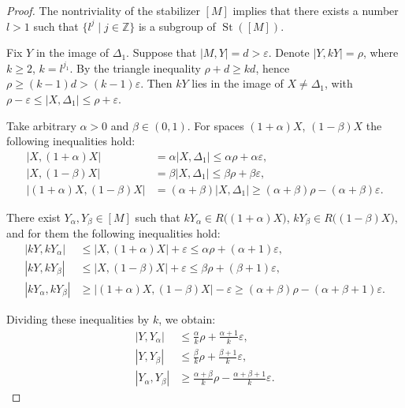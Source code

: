 \documentclass[leqno]{article}
\begin{document}
\begin{proof}
  The nontriviality of the stabilizer $[M]$ implies that there exists
  a number $l > 1$ such that $\{l^{j} \mid j\in \mathbb{Z}\}$ is a
  subgroup of $\operatorname{St}([M])$.

  Fix $Y$ in the image of $\Delta_{1}$. Suppose that $|M, Y| = d >
  \varepsilon$. Denote $|Y, kY| = \rho$, where $k \geq 2$, $k =
  l^{j_{1}}$. By the triangle inequality $\rho + d \geq kd$, hence
  $\rho \geq (k-1)d > (k-1)\varepsilon$. Then $kY$ lies in the image
  of $X \neq \Delta_1$, with $\rho - \varepsilon \leq |X, \Delta_1|
  \leq \rho + \varepsilon$.

  Take arbitrary $\alpha > 0$ and $\beta \in (0,1)$. For spaces
  $(1+\alpha)X$, $(1-\beta)X$ the following inequalities hold:
  \begin{align*}
    |X, (1+\alpha)X| &= \alpha |X, \Delta_1| \leq \alpha\rho +
    \alpha\varepsilon, \\
    |X, (1-\beta)X| &= \beta|X, \Delta_1| \leq \beta\rho + \beta\varepsilon, \\
    |(1+\alpha) X, (1-\beta)X| &= (\alpha + \beta)|X, \Delta_1| \geq
    (\alpha+\beta)\rho - (\alpha+\beta)\varepsilon.
  \end{align*}

  There exist $Y_\alpha, Y_\beta \in [M]$ such that $kY_\alpha \in
  R\big((1+\alpha)X\big)$, $kY_\beta \in R\big((1-\beta)X\big)$, and
  for them the following inequalities hold:
  \begin{align*}
    |kY, kY_\alpha| &\leq |X, (1+\alpha)X| + \varepsilon \leq
    \alpha\rho + (\alpha+1)\varepsilon, \\
    |kY, kY_\beta| &\leq |X, (1-\beta)X| + \varepsilon \leq \beta\rho
    + (\beta+1)\varepsilon, \\
    |kY_\alpha, kY_\beta| &\geq |(1+\alpha)X, (1-\beta)X| -
    \varepsilon \geq (\alpha+\beta)\rho - (\alpha+\beta+1)\varepsilon.
  \end{align*}

  Dividing these inequalities by $k$, we obtain:
  \begin{align*}
    |Y, Y_{\alpha}| &\leq \frac{\alpha}{k}\rho +
    \frac{\alpha+1}{k}\varepsilon, \\
    |Y, Y_{\beta}| &\leq \frac{\beta}{k}\rho + \frac{\beta+1}{k}\varepsilon, \\
    |Y_\alpha, Y_{\beta}| &\geq \frac{\alpha+\beta}{k}\rho -
    \frac{\alpha+\beta+1}{k}\varepsilon.
  \end{align*}


\end{proof}
\end{document}
